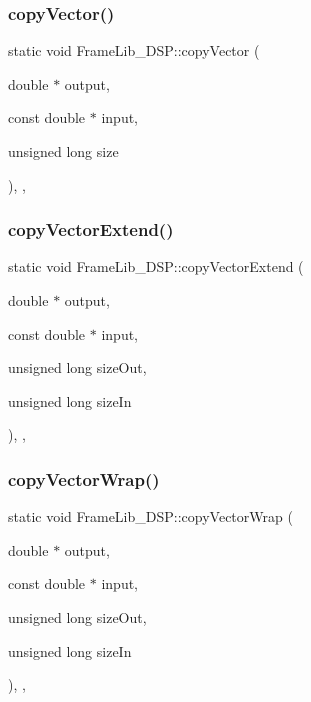 \subsubsection{\texorpdfstring{copy\+Vector()}{copyVector()}}
{\footnotesize\ttfamily static void Frame\+Lib\+\_\+\+D\+S\+P\+::copy\+Vector (\begin{DoxyParamCaption}\item[{double $\ast$}]{output,  }\item[{const double $\ast$}]{input,  }\item[{unsigned long}]{size }\end{DoxyParamCaption})\hspace{0.3cm}{\ttfamily [inline]}, {\ttfamily [static]}, {\ttfamily [protected]}}

\mbox{\label{class_frame_lib___d_s_p_a53100cc66147cbb05374e5d877ad4bd7}} 
\subsubsection{\texorpdfstring{copy\+Vector\+Extend()}{copyVectorExtend()}}
{\footnotesize\ttfamily static void Frame\+Lib\+\_\+\+D\+S\+P\+::copy\+Vector\+Extend (\begin{DoxyParamCaption}\item[{double $\ast$}]{output,  }\item[{const double $\ast$}]{input,  }\item[{unsigned long}]{size\+Out,  }\item[{unsigned long}]{size\+In }\end{DoxyParamCaption})\hspace{0.3cm}{\ttfamily [inline]}, {\ttfamily [static]}, {\ttfamily [protected]}}

\mbox{\label{class_frame_lib___d_s_p_a11ceb4866739ced35e33ce353d293130}} 
\subsubsection{\texorpdfstring{copy\+Vector\+Wrap()}{copyVectorWrap()}}
{\footnotesize\ttfamily static void Frame\+Lib\+\_\+\+D\+S\+P\+::copy\+Vector\+Wrap (\begin{DoxyParamCaption}\item[{double $\ast$}]{output,  }\item[{const double $\ast$}]{input,  }\item[{unsigned long}]{size\+Out,  }\item[{unsigned long}]{size\+In }\end{DoxyParamCaption})\hspace{0.3cm}{\ttfamily [inline]}, {\ttfamily [static]}, {\ttfamily [protected]}}

